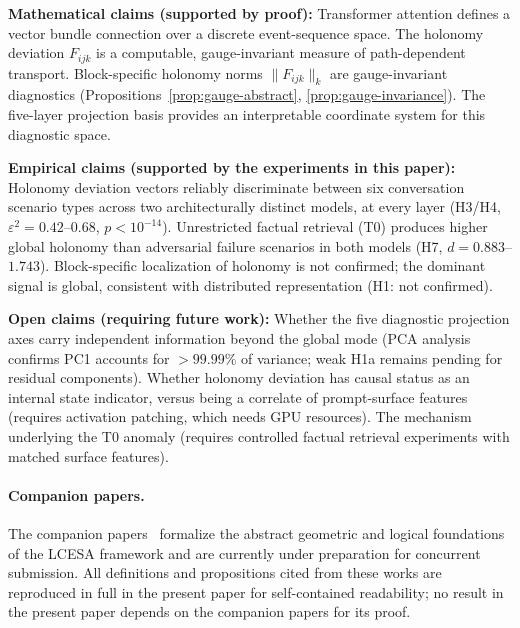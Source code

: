 \textbf{Mathematical claims (supported by proof):} Transformer attention defines a vector bundle connection over a discrete event-sequence space. The holonomy deviation $F_{ijk}$ is a computable, gauge-invariant measure of path-dependent transport. Block-specific holonomy norms $\|F_{ijk}\|_k$ are gauge-invariant diagnostics (Propositions~\ref{prop:gauge-abstract}, \ref{prop:gauge-invariance}). The five-layer projection basis provides an interpretable coordinate system for this diagnostic space.

\textbf{Empirical claims (supported by the experiments in this paper):} Holonomy deviation vectors reliably discriminate between six conversation scenario types across two architecturally distinct models, at every layer (H3/H4, $\varepsilon^2 = 0.42$--$0.68$, $p < 10^{-14}$). Unrestricted factual retrieval (T0) produces higher global holonomy than adversarial failure scenarios in both models (H7, $d = 0.883$--$1.743$). Block-specific localization of holonomy is not confirmed; the dominant signal is global, consistent with distributed representation (H1: not confirmed).

\textbf{Open claims (requiring future work):} Whether the five diagnostic projection axes carry independent information beyond the global mode (PCA analysis confirms PC1 accounts for $>99.99\%$ of variance; weak H1a remains pending for residual components). Whether holonomy deviation has causal status as an internal state indicator, versus being a correlate of prompt-surface features (requires activation patching, which needs GPU resources). The mechanism underlying the T0 anomaly (requires controlled factual retrieval experiments with matched surface features).

\paragraph{Companion papers.}
The companion papers~\cite{LCESA, self-jurisdiction} formalize the abstract geometric
and logical foundations of the LCESA framework and are currently under preparation for
concurrent submission. All definitions and propositions cited from these works are
reproduced in full in the present paper for self-contained readability; no result in
the present paper depends on the companion papers for its proof.
